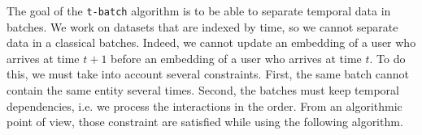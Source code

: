The goal of the \texttt{t-batch} algorithm is to be able to separate temporal data in batches. We work on datasets that are indexed by time, so we cannot separate data in a classical batches. Indeed, we cannot update an embedding of a user who arrives at time $t+1$ before an embedding of a user who arrives at time $t$. To do this, we must take into account several constraints. First, the same batch cannot contain the same entity several times. Second, the batches must keep temporal dependencies, i.e. we process the interactions in the order. From an algorithmic point of view, those constraint are satisfied while using the following algorithm.\\



